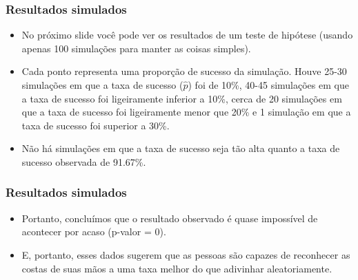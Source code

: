 
\begin{frame}
\frametitle{Resultados simulados}

\begin{itemize}
\justifying
\item No próximo slide você pode ver os resultados de um teste de hipótese (usando apenas 100 simulações para manter as coisas simples).
\justifying
\item Cada ponto representa uma proporção de sucesso da simulação. Houve 25-30 simulações em que a taxa de sucesso ($\hat{p}$) foi de 10\%, 40-45 simulações em que a taxa de sucesso foi ligeiramente inferior a 10\%, cerca de 20 simulações em que a taxa de sucesso foi ligeiramente menor que 20\% e 1 simulação em que a taxa de sucesso foi superior a 30\%.
\justifying
\item Não há simulações em que a taxa de sucesso seja tão alta quanto a taxa de sucesso observada de 91.67\%.

\end{itemize}
\end{frame}


\begin{frame}
\frametitle{Resultados simulados}

\begin{itemize}
\justifying
\item Portanto, concluímos que o resultado observado é quase impossível de acontecer por acaso (p-valor = 0).
\justifying
\item E, portanto, esses dados sugerem que as pessoas são capazes de reconhecer as costas de suas mãos a uma taxa melhor do que adivinhar aleatoriamente.

\end{itemize}

\end{frame}


